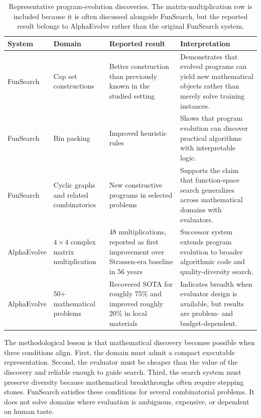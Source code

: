 \begin{table}[t]
\centering
\caption{Representative program-evolution discoveries.  The matrix-multiplication row is included because it is often discussed alongside FunSearch, but the reported result belongs to AlphaEvolve rather than the original FunSearch system.}
\label{tab:funsearch-alphaevolve-results}
{\TableTight
\begin{tabularx}{\textwidth}{@{}L{0.16\textwidth}L{0.19\textwidth}L{0.20\textwidth}Y@{}}
\toprule
\textbf{System} & \textbf{Domain} & \textbf{Reported result} & \textbf{Interpretation} \\
\midrule
FunSearch & Cap set constructions & Better construction than previously known in the studied setting & Demonstrates that evolved programs can yield new mathematical objects rather than merely solve training instances. \\
FunSearch & Bin packing & Improved heuristic rules & Shows that program evolution can discover practical algorithms with interpretable logic. \\
FunSearch & Cyclic graphs and related combinatorics & New constructive programs in selected problems & Supports the claim that function-space search generalizes across mathematical domains with evaluators. \\
AlphaEvolve & $4\times4$ complex matrix multiplication & 48 multiplications, reported as first improvement over Strassen-era baseline in 56 years & Successor system extends program evolution to broader algorithmic code and quality-diversity search. \\
AlphaEvolve & 50+ mathematical problems & Recovered SOTA for roughly 75\% and improved roughly 20\% in local materials & Indicates breadth when evaluator design is available, but results are problem- and budget-dependent. \\
\bottomrule
\end{tabularx}}
\end{table}

The methodological lesson is that mathematical discovery becomes possible when three conditions align.  First, the domain must admit a compact executable representation.  Second, the evaluator must be cheaper than the value of the discovery and reliable enough to guide search.  Third, the search system must preserve diversity because mathematical breakthroughs often require stepping stones.  FunSearch satisfies these conditions for several combinatorial problems.  It does not solve domains where evaluation is ambiguous, expensive, or dependent on human taste.

